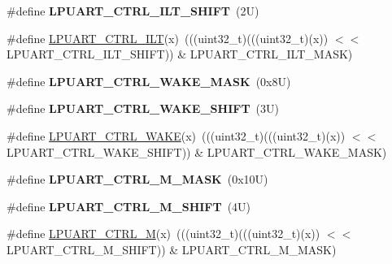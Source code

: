 \begin{DoxyCompactItemize}
\item 
\mbox{\label{group___l_p_u_a_r_t___register___masks_ga7a6af3831641717a53dabbd3e21710f3}} 
\#define {\bfseries L\+P\+U\+A\+R\+T\+\_\+\+C\+T\+R\+L\+\_\+\+I\+L\+T\+\_\+\+S\+H\+I\+FT}~(2\+U)
\item 
\#define \mbox{\hyperlink{group___l_p_u_a_r_t___register___masks_gaf3781611e4e6334aad92367fe38e407a}{L\+P\+U\+A\+R\+T\+\_\+\+C\+T\+R\+L\+\_\+\+I\+LT}}(x)~(((uint32\+\_\+t)(((uint32\+\_\+t)(x)) $<$$<$ L\+P\+U\+A\+R\+T\+\_\+\+C\+T\+R\+L\+\_\+\+I\+L\+T\+\_\+\+S\+H\+I\+FT)) \& L\+P\+U\+A\+R\+T\+\_\+\+C\+T\+R\+L\+\_\+\+I\+L\+T\+\_\+\+M\+A\+SK)
\item 
\mbox{\label{group___l_p_u_a_r_t___register___masks_gaac7cd6bdf3caa274576f08100b270c94}} 
\#define {\bfseries L\+P\+U\+A\+R\+T\+\_\+\+C\+T\+R\+L\+\_\+\+W\+A\+K\+E\+\_\+\+M\+A\+SK}~(0x8\+U)
\item 
\mbox{\label{group___l_p_u_a_r_t___register___masks_ga3cbb44f788c3fa0008d1c5abbd7c031c}} 
\#define {\bfseries L\+P\+U\+A\+R\+T\+\_\+\+C\+T\+R\+L\+\_\+\+W\+A\+K\+E\+\_\+\+S\+H\+I\+FT}~(3\+U)
\item 
\#define \mbox{\hyperlink{group___l_p_u_a_r_t___register___masks_ga5a55b8264763b2e6d968324763121b60}{L\+P\+U\+A\+R\+T\+\_\+\+C\+T\+R\+L\+\_\+\+W\+A\+KE}}(x)~(((uint32\+\_\+t)(((uint32\+\_\+t)(x)) $<$$<$ L\+P\+U\+A\+R\+T\+\_\+\+C\+T\+R\+L\+\_\+\+W\+A\+K\+E\+\_\+\+S\+H\+I\+FT)) \& L\+P\+U\+A\+R\+T\+\_\+\+C\+T\+R\+L\+\_\+\+W\+A\+K\+E\+\_\+\+M\+A\+SK)
\item 
\mbox{\label{group___l_p_u_a_r_t___register___masks_gafa7f038763c68042afc6ff7dde64cb88}} 
\#define {\bfseries L\+P\+U\+A\+R\+T\+\_\+\+C\+T\+R\+L\+\_\+\+M\+\_\+\+M\+A\+SK}~(0x10\+U)
\item 
\mbox{\label{group___l_p_u_a_r_t___register___masks_ga287ed872dd76fbb802b0db4d5242d14c}} 
\#define {\bfseries L\+P\+U\+A\+R\+T\+\_\+\+C\+T\+R\+L\+\_\+\+M\+\_\+\+S\+H\+I\+FT}~(4\+U)
\item 
\#define \mbox{\hyperlink{group___l_p_u_a_r_t___register___masks_ga5ea03e6834ef610b343c290d4484ddac}{L\+P\+U\+A\+R\+T\+\_\+\+C\+T\+R\+L\+\_\+M}}(x)~(((uint32\+\_\+t)(((uint32\+\_\+t)(x)) $<$$<$ L\+P\+U\+A\+R\+T\+\_\+\+C\+T\+R\+L\+\_\+\+M\+\_\+\+S\+H\+I\+FT)) \& L\+P\+U\+A\+R\+T\+\_\+\+C\+T\+R\+L\+\_\+\+M\+\_\+\+M\+A\+SK)
$$
\end{DoxyCompactItemize}
